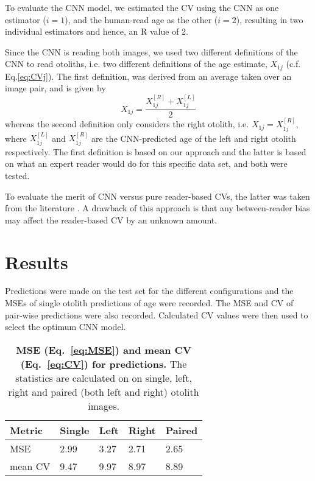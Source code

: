 \documentclass[10pt,letterpaper]{article}
\begin{document}
To evaluate the CNN model, we estimated the CV using the CNN as one estimator ($i=1$), and the human-read age as the other ($i=2$), resulting in two individual estimators and hence, an R value of 2.

Since the CNN is reading both images, we used two different definitions of the CNN to read otoliths, i.e. two different definitions of the age estimate, $X_{1j}$ (c.f. Eq.\eqref{eq:CVj}). The first definition, was derived from an average taken over an image pair, and is given by
\begin{equation}
X_{1j} =  \dfrac{ X^{[R]}_{1j} + X^{[L]}_{1j} }{2} \label{eq:X_1ja}
\end{equation}
whereas the second definition only considers the right otolith, i.e.
$%
X_{1j} =  X^{[R]}_{1j},
$%
 where $X^{[L]}_{1j}$ and $X^{[R]}_{1j}$ are the CNN-predicted age of the left and right otolith respectively. The first definition is based on our approach and the latter is based on what an expert reader would do \citep{albert2009towards} for this specific data set, and both were tested.

To evaluate the merit of CNN versus pure reader-based CVs, the latter was taken from the literature \citep{albert2009towards,albert2016growth}. A drawback of this approach is that any between-reader bias may affect the reader-based CV by an unknown amount. 

\section*{Results}

Predictions were made on the test set for the different configurations and the MSEs of single otolith predictions of age were recorded. The MSE and CV of pair-wise predictions were also recorded. Calculated CV values were then used to select the optimum CNN model. 
% 
% 

\begin{table}[hbt!]
  \centering
\caption{\textbf{MSE (Eq.~\ref{eq:MSE}) and mean CV (Eq.~\ref{eq:CV}) for predictions.} The statistics are calculated on on single, left, right and paired (both left and right) otolith images.}  
\begin{tabular}{lllll}
Metric  & Single & Left & Right & Paired  \\ \hline
MSE & 2.99 & 3.27 & 2.71 & 2.65 \\ 
mean CV & 9.47 & 9.97 & 8.97 & 8.89 \\ 
\end{tabular}
\label{tab:cv}
\end{table}
\end{document}
